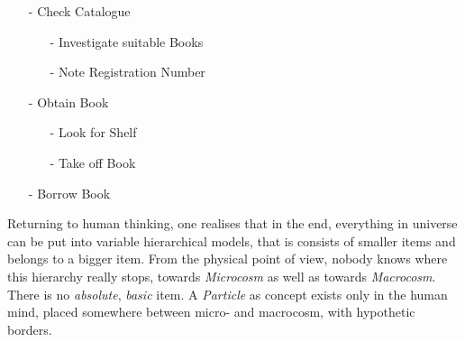 \begin{itemize}
    \item[-] Check Catalogue
    \begin{itemize}
        \item[-] Investigate suitable Books
        \item[-] Note Registration Number
    \end{itemize}
    \item[-] Obtain Book
    \begin{itemize}
        \item[-] Look for Shelf
        \item[-] Take off Book
    \end{itemize}
    \item[-] Borrow Book
\end{itemize}

Returning to human thinking, one realises that in the end, everything in
universe can be put into variable hierarchical models, that is consists of
smaller items and belongs to a bigger item. From the physical point of view,
nobody knows where this hierarchy really stops, towards \emph{Microcosm} as
well as towards \emph{Macrocosm}. There is no \emph{absolute}, \emph{basic}
item. A \emph{Particle} as concept exists only in the human mind, placed
somewhere between micro- and macrocosm, with hypothetic borders.
